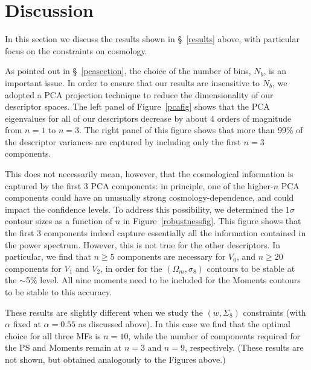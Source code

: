 \documentclass[reprint,aps,prd,superscriptaddress,showkeys,showpacs]{revtex4-1}
\begin{document}


\section{Discussion}
\label{discussion}

In this section we discuss the results shown in \S~\ref{results}
above, with particular focus on the constraints on cosmology.

As pointed out in \S~\ref{pcasection}, the choice of the number of
bins, $N_b$, is an important issue. In order to ensure that our
results are insensitive to $N_b$, we adopted a PCA projection
technique to reduce the dimensionality of our descriptor spaces. The
left panel of Figure~\ref{pcafig} shows that the PCA eigenvalues for
all of our descriptors decrease by about 4 orders of magnitude from
$n=1$ to $n=3$. The right panel of this figure shows that more than
99\% of the descriptor variances are captured by including only the
first $n=3$ components.

This does not necessarily mean, however, that the cosmological
information is captured by the first 3 PCA components: in principle,
one of the higher-$n$ PCA components could have an unusually strong
cosmology-dependence, and could impact the confidence levels.  To
address this possibility, we determined the $1\sigma$ contour sizes as
a function of $n$ in Figure~\ref{robustnessfig}.  This figure shows
that the first 3 components indeed capture essentially all the
information contained in the power spectrum. However, this is not true
for the other descriptors. In particular, we find that $n\geq5$
components are necessary for $V_0$, and $n\geq20$ components for $V_1$
and $V_2$, in order for the $(\Omega_m,\sigma_8)$ contours to be
stable at the $\sim$5\% level. All nine moments need to be included
for the Moments contours to be stable to this accuracy.

These results are slightly different when we study the $(w,\Sigma_8)$
constraints (with $\alpha$ fixed at $\alpha=0.55$ as discussed
above). In this case we find that the optimal choice for all three MFs
is $n=10$, while the number of components required for the PS and
Moments remain at $n=3$ and $n=9$, respectively. (These results are
not shown, but obtained analogously to the Figures above.)
\end{document}
